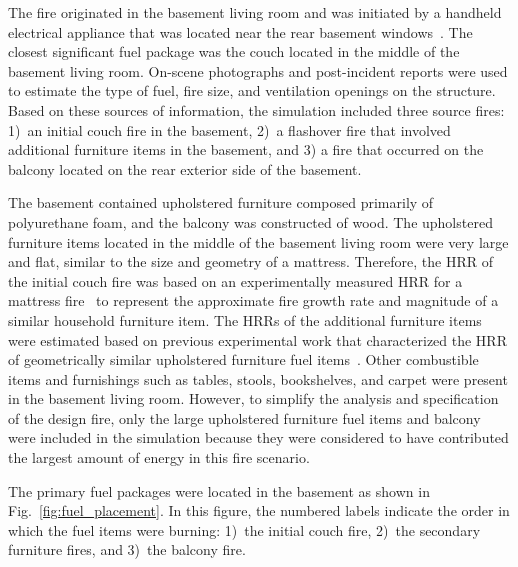 \documentclass[12pt,oneside]{book}
\begin{document}
The fire originated in the basement living room and was initiated by a handheld electrical appliance that was located near the rear basement windows~\cite{NIOSH:Bowyer2}. The closest significant fuel package was the couch located in the middle of the basement living room. On-scene photographs and post-incident reports were used to estimate the type of fuel, fire size, and ventilation openings on the structure. Based on these sources of information, the simulation included three source fires: 1)~an initial couch fire in the basement, 2)~a flashover fire that involved additional furniture items in the basement, and 3) a fire that occurred on the balcony located on the rear exterior side of the basement.

The basement contained upholstered furniture composed primarily of polyurethane foam, and the balcony was constructed of wood. The upholstered furniture items located in the middle of the basement living room were very large and flat, similar to the size and geometry of a mattress. Therefore, the HRR of the initial couch fire was based on an experimentally measured HRR for a mattress fire~\cite{madrzykowski2009fire} to represent the approximate fire growth rate and magnitude of a similar household furniture item. The HRRs of the additional furniture items were estimated based on previous experimental work that characterized the HRR of geometrically similar upholstered furniture fuel items~\cite{madrzykowski2009fire,Madrzykowski:2,Babrauskas:1}. Other combustible items and furnishings such as tables, stools, bookshelves, and carpet were present in the basement living room. However, to simplify the analysis and specification of the design fire, only the large upholstered furniture fuel items and balcony were included in the simulation because they were considered to have contributed the largest amount of energy in this fire scenario.

The primary fuel packages were located in the basement as shown in Fig.~\ref{fig:fuel_placement}. In this figure, the numbered labels indicate the order in which the fuel items were burning: 1)~the initial couch fire, 2)~the secondary furniture fires, and 3)~the balcony fire.
\end{document}
